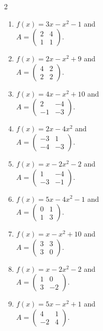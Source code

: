 \begin{multicols}{2}
\begin{enumerate}[label=\arabic*.,  leftmargin=*]
$A = \begin{pmatrix} -4 & 3 \\ -2 & 0 \end{pmatrix}$.
\item $f(x) = 3x - x^2 - 1$ and \\
$A = \begin{pmatrix} 2 & 4 \\ 1 & 1 \end{pmatrix}$.
\item $f(x) = 2x - x^2 + 9$ and \\
$A = \begin{pmatrix} 4 & 2 \\ 2 & 2 \end{pmatrix}$.
\item $f(x) = 4x - x^2 + 10$ and \\
$A = \begin{pmatrix} 2 & -4 \\ -1 & -3 \end{pmatrix}$.
\item $f(x) = 2x - 4x^2$ and \\
$A = \begin{pmatrix} -3 & 1 \\ -4 & -3 \end{pmatrix}$.
\item $f(x) = x - 2x^2 - 2$ and \\
$A = \begin{pmatrix} 1 & -4 \\ -3 & -1 \end{pmatrix}$.
\item $f(x) = 5x - 4x^2 - 1$ and \\
$A = \begin{pmatrix} 0 & 1 \\ 1 & 3 \end{pmatrix}$.
\item $f(x) = x - x^2 + 10$ and \\
$A = \begin{pmatrix} 3 & 3 \\ 3 & 0 \end{pmatrix}$.
\item $f(x) = x - 2x^2 - 2$ and \\
$A = \begin{pmatrix} 1 & 0 \\ 3 & -2 \end{pmatrix}$.
\item $f(x) = 5x - x^2 + 1$ and \\
$A = \begin{pmatrix} 4 & 1 \\ -2 & 4 \end{pmatrix}$.

\end{enumerate}
\end{multicols}

